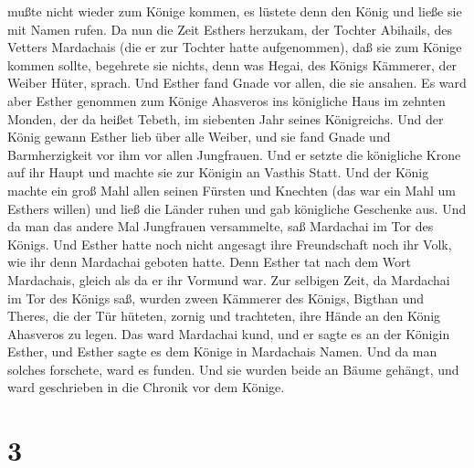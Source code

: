 mußte nicht wieder zum Könige kommen, es lüstete denn den König und
ließe sie mit Namen rufen.  Da nun die Zeit Esthers
herzukam, der Tochter Abihails, des Vetters Mardachais (die er zur
Tochter hatte aufgenommen), daß sie zum Könige kommen sollte, begehrete
sie nichts, denn was Hegai, des Königs Kämmerer, der Weiber Hüter,
sprach. Und Esther fand Gnade vor allen, die sie ansahen. 
Es ward aber Esther genommen zum Könige Ahasveros ins königliche Haus im
zehnten Monden, der da heißet Tebeth, im siebenten Jahr seines
Königreichs.  Und der König gewann Esther lieb über alle
Weiber, und sie fand Gnade und Barmherzigkeit vor ihm vor allen
Jungfrauen. Und er setzte die königliche Krone auf ihr Haupt und machte
sie zur Königin an Vasthis Statt.  Und der König machte ein
groß Mahl allen seinen Fürsten und Knechten (das war ein Mahl um Esthers
willen) und ließ die Länder ruhen und gab königliche Geschenke aus.
 Und da man das andere Mal Jungfrauen versammelte, saß
Mardachai im Tor des Königs.  Und Esther hatte noch nicht
angesagt ihre Freundschaft noch ihr Volk, wie ihr denn Mardachai geboten
hatte. Denn Esther tat nach dem Wort Mardachais, gleich als da er ihr
Vormund war.  Zur selbigen Zeit, da Mardachai im Tor des
Königs saß, wurden zween Kämmerer des Königs, Bigthan und Theres, die
der Tür hüteten, zornig und trachteten, ihre Hände an den König
Ahasveros zu legen.  Das ward Mardachai kund, und er sagte
es an der Königin Esther, und Esther sagte es dem Könige in Mardachais
Namen.  Und da man solches forschete, ward es funden. Und
sie wurden beide an Bäume gehängt, und ward geschrieben in die Chronik
vor dem Könige.

\hypertarget{section-2}{%
\section{3}\label{section-2}}

